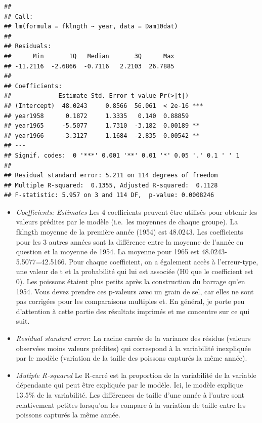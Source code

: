 \documentclass[12pt,]{book}
\providecommand{\tightlist}{%
  \setlength{\itemsep}{0pt}\setlength{\parskip}{0pt}}
\begin{document}
\begin{verbatim}
## 
## Call:
## lm(formula = fklngth ~ year, data = Dam10dat)
## 
## Residuals:
##      Min       1Q   Median       3Q      Max 
## -11.2116  -2.6866  -0.7116   2.2103  26.7885 
## 
## Coefficients:
##             Estimate Std. Error t value Pr(>|t|)    
## (Intercept)  48.0243     0.8566  56.061  < 2e-16 ***
## year1958      0.1872     1.3335   0.140  0.88859    
## year1965     -5.5077     1.7310  -3.182  0.00189 ** 
## year1966     -3.3127     1.1684  -2.835  0.00542 ** 
## ---
## Signif. codes:  0 '***' 0.001 '**' 0.01 '*' 0.05 '.' 0.1 ' ' 1
## 
## Residual standard error: 5.211 on 114 degrees of freedom
## Multiple R-squared:  0.1355, Adjusted R-squared:  0.1128 
## F-statistic: 5.957 on 3 and 114 DF,  p-value: 0.0008246
\end{verbatim}

\begin{itemize}
\tightlist
\item
  \emph{Coefficients: Estimates} Les 4 coefficients peuvent être utilisés pour obtenir les valeurs prédites par le modèle (i.e.~les moyennes de chaque groupe). La fklngth moyenne de la première année (1954) est 48.0243. Les coefficients pour les 3 autres années sont la différence entre la moyenne de l'année en question et la moyenne de 1954. La moyenne pour 1965 est 48.0243-5.5077=42.5166. Pour chaque coefficient, on a également accès à l'erreur-type, une valeur de t et la probabilité qui lui est associée (H0 que le coefficient est 0). Les poissons étaient plus petits après la construction du barrage qu'en 1954. Vous devez prendre ces p-valeurs avec un grain de sel, car elles ne sont pas corrigées pour les comparaisons multiples et. En général, je porte peu d'attention à cette partie des résultats imprimés et me concentre sur ce qui suit.
\item
  \emph{Residual standard error}: La racine carrée de la variance des résidus (valeurs observées moins valeurs prédites) qui correspond à la variabilité inexpliquée par le modèle (variation de la taille des poissons capturés la même année).
\item
  \emph{Mutiple R-squared} Le R-carré est la proportion de la variabilité de la variable dépendante qui peut être expliquée par le modèle. Ici, le modèle explique 13.5\% de la variabilité. Les différences de taille d'une année à l'autre sont relativement petites lorsqu'on les compare à la variation de taille entre les poissons capturés la même année.
\end{itemize}
\end{document}
